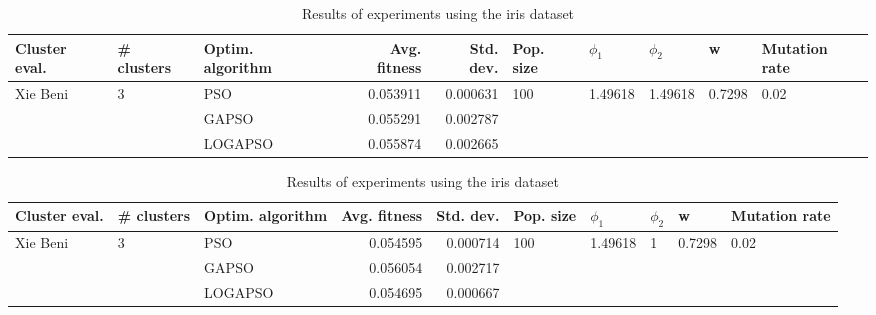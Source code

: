 \documentclass{article}
\begin{document}
\begin{table}
\centering
\caption{Results of experiments using the iris dataset}
\begin{tabular}{lllrrlllll}
\toprule
            Cluster eval. &        \# clusters & Optim. algorithm &  Avg. fitness &  Std. dev. &            Pop. size &               $\phi_{1}$ &               $\phi_{2}$ &                       w &         Mutation rate \\
\midrule
\multirow{3}{*}{Xie Beni} & \multirow{3}{*}{3} &              PSO &      0.053911 &   0.000631 & \multirow{3}{*}{100} & \multirow{3}{*}{1.49618} & \multirow{3}{*}{1.49618} & \multirow{3}{*}{0.7298} & \multirow{3}{*}{0.02} \\
                          &                    &            GAPSO &      0.055291 &   0.002787 &                      &                          &                          &                         &                       \\
                          &                    &          LOGAPSO &      0.055874 &   0.002665 &                      &                          &                          &                         &                       \\
\bottomrule
\end{tabular}
\end{table}
\begin{table}
\centering
\caption{Results of experiments using the iris dataset}
\begin{tabular}{lllrrlllll}
\toprule
            Cluster eval. &        \# clusters & Optim. algorithm &  Avg. fitness &  Std. dev. &            Pop. size &               $\phi_{1}$ &         $\phi_{2}$ &                       w &         Mutation rate \\
\midrule
\multirow{3}{*}{Xie Beni} & \multirow{3}{*}{3} &              PSO &      0.054595 &   0.000714 & \multirow{3}{*}{100} & \multirow{3}{*}{1.49618} & \multirow{3}{*}{1} & \multirow{3}{*}{0.7298} & \multirow{3}{*}{0.02} \\
                          &                    &            GAPSO &      0.056054 &   0.002717 &                      &                          &                    &                         &                       \\
                          &                    &          LOGAPSO &      0.054695 &   0.000667 &                      &                          &                    &                         &                       \\
\bottomrule
\end{tabular}
\end{table}
\end{document}
